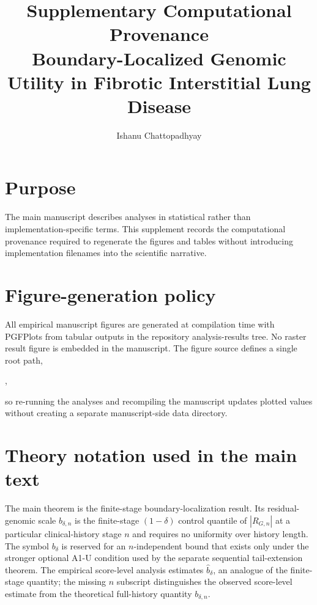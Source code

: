 \documentclass[10pt]{article}
\title{Supplementary Computational Provenance\\Boundary-Localized Genomic Utility in Fibrotic Interstitial Lung Disease}
\author{Ishanu Chattopadhyay}
\date{}
\begin{document}
\maketitle

\section*{Purpose}
The main manuscript describes analyses in statistical rather than implementation-specific terms. This supplement records the computational provenance required to regenerate the figures and tables without introducing implementation filenames into the scientific narrative.

\section*{Figure-generation policy}
All empirical manuscript figures are generated at compilation time with PGFPlots from tabular outputs in the repository analysis-results tree. No raster result figure is embedded in the manuscript. The figure source defines a single root path,
\begin{center}
,
\end{center}
so re-running the analyses and recompiling the manuscript updates plotted values without creating a separate manuscript-side data directory.

\section*{Theory notation used in the main text}
The main theorem is the finite-stage boundary-localization result. Its residual-genomic scale $b_{\delta,n}$ is the finite-stage $(1-\delta)$ control quantile of $|R_{G,n}|$ at a particular clinical-history stage $n$ and requires no uniformity over history length. The symbol $b_\delta$ is reserved for an $n$-independent bound that exists only under the stronger optional A1-U condition used by the separate sequential tail-extension theorem. The empirical score-level analysis estimates $\widehat b_\delta$, an analogue of the finite-stage quantity; the missing $n$ subscript distinguishes the observed score-level estimate from the theoretical full-history quantity $b_{\delta,n}$.
\end{document}
